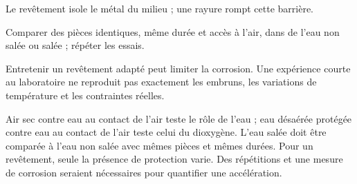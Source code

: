 \par\noindent\begin{minipage}{\linewidth}
\label{cor-defi-5}\begin{questions}
\item Le revêtement isole le métal du milieu ; une rayure rompt cette barrière.
\item Comparer des pièces identiques, même durée et accès à l’air, dans de l’eau non salée ou salée ; répéter les essais.
\item Entretenir un revêtement adapté peut limiter la corrosion. Une expérience courte au laboratoire ne reproduit pas exactement les embruns, les variations de température et les contraintes réelles.
\end{questions}
\end{minipage}
\par\noindent\begin{minipage}{\linewidth}
\label{cor-activite-5}
Air sec contre eau au contact de l’air teste le rôle de l’eau ; eau désaérée protégée contre eau au contact de l’air teste celui du dioxygène. L’eau salée doit être comparée à l’eau non salée avec mêmes pièces et mêmes durées. Pour un revêtement, seule la présence de protection varie. Des répétitions et une mesure de corrosion seraient nécessaires pour quantifier une accélération.\par\end{minipage}
